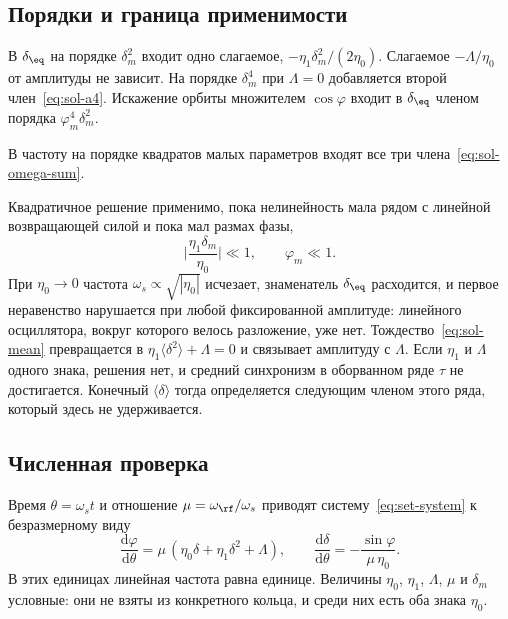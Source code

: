 \subsection{Порядки и граница применимости}
\label{sec:sol-order}

В $\delta_\eq$ на порядке $\delta_m^2$ входит одно слагаемое, $-\eta_1\delta_m^2/(2\eta_0)$. Слагаемое $-\Lambda/\eta_0$ от амплитуды не зависит. На порядке $\delta_m^4$ при $\Lambda=0$ добавляется второй член~\eqref{eq:sol-a4}. Искажение орбиты множителем $\cos\varphi$ входит в $\delta_\eq$ членом порядка $\varphi_m^4\delta_m^2$.

В частоту на порядке квадратов малых параметров входят все три члена~\eqref{eq:sol-omega-sum}.

Квадратичное решение применимо, пока нелинейность мала рядом с линейной возвращающей силой и пока мал размах фазы,
\begin{equation}
\label{eq:sol-valid}
\Biggl|\frac{\eta_1\delta_m}{\eta_0}\Biggr|\ll 1,
\qquad
\varphi_m\ll 1.
\end{equation}
При $\eta_0\to 0$ частота $\omega_s\propto\sqrt{|\eta_0|}$ исчезает, знаменатель $\delta_\eq$ расходится, и первое неравенство нарушается при любой фиксированной амплитуде: линейного осциллятора, вокруг которого велось разложение, уже нет. Тождество~\eqref{eq:sol-mean} превращается в $\eta_1\langle\delta^2\rangle+\Lambda=0$ и связывает амплитуду с $\Lambda$. Если $\eta_1$ и $\Lambda$ одного знака, решения нет, и средний синхронизм в оборванном ряде $\tau$ не достигается. Конечный $\langle\delta\rangle$ тогда определяется следующим членом этого ряда, который здесь не удерживается.

\subsection{Численная проверка}
\label{sec:sol-num}

Время $\theta=\omega_s t$ и отношение $\mu=\omega_\rf/\omega_s$ приводят систему~\eqref{eq:set-system} к безразмерному виду
\begin{equation}
\label{eq:sol-dim}
\frac{\mathrm{d}\varphi}{\mathrm{d}\theta}
=\mu\,(\eta_0\delta+\eta_1\delta^2+\Lambda),
\qquad
\frac{\mathrm{d}\delta}{\mathrm{d}\theta}
=-\frac{\sin\varphi}{\mu\,\eta_0}.
\end{equation}
В этих единицах линейная частота равна единице. Величины $\eta_0$, $\eta_1$, $\Lambda$, $\mu$ и $\delta_m$ условные: они не взяты из конкретного кольца, и среди них есть оба знака $\eta_0$.

